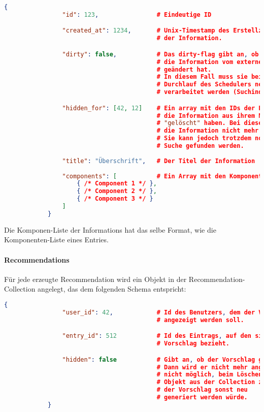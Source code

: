 		\begin{lstlisting}[language=JSON]
			{
				"id": 123,                # Eindeutige ID

				"created_at": 1234,       # Unix-Timestamp des Erstellzeitpunktes
				                          # der Information.

				"dirty": false,           # Das dirty-flag gibt an, ob sich
				                          # die Information vom externen Service
				                          # geändert hat.
				                          # In diesem Fall muss sie beim nächsten
				                          # Durchlauf des Schedulers neu
				                          # verarbeitet werden (Suchindex!).

				"hidden_for": [42, 12]    # Ein array mit den IDs der Benutzer, die
				                          # die Information aus ihrem Newsfeed
				                          # "gelöscht" haben. Bei diesen wird 
				                          # die Information nicht mehr angezeigt.
				                          # Sie kann jedoch trotzdem noch über die
				                          # Suche gefunden werden.
				
				"title": "Überschrift",   # Der Titel der Information
				
				"components": [           # Ein Array mit den Komponenten der Information
					{ /* Component 1 */ },
					{ /* Component 2 */ },
					{ /* Component 3 */ }
				]
			}
		\end{lstlisting}

		Die Komponen-Liste der Informations hat das selbe Format, wie die Komponenten-Liste eines Entries.

	\paragraph{Recommendations} %
	\label{par:reccomendations}
		
		Für jede erzeugte Recommendation wird ein Objekt in der Recommendation-Collection angelegt, das dem folgenden Schema entspricht:

		\begin{lstlisting}[language=JSON]
			{
				"user_id": 42,            # Id des Benutzers, dem der Vorschlag
				                          # angezeigt werden soll.

				"entry_id": 512           # Id des Eintrags, auf den sich der
				                          # Vorschlag bezieht.

				"hidden": false           # Gibt an, ob der Vorschlag gelöscht wurde. 
				                          # Dann wird er nicht mehr angezeigt. Es ist 
				                          # nicht möglich, beim Löschen einfach das 
				                          # Objekt aus der Collection zu löschen, da 
				                          # der Vorschlag sonst neu
				                          # generiert werden würde. 
			}
		\end{lstlisting}

